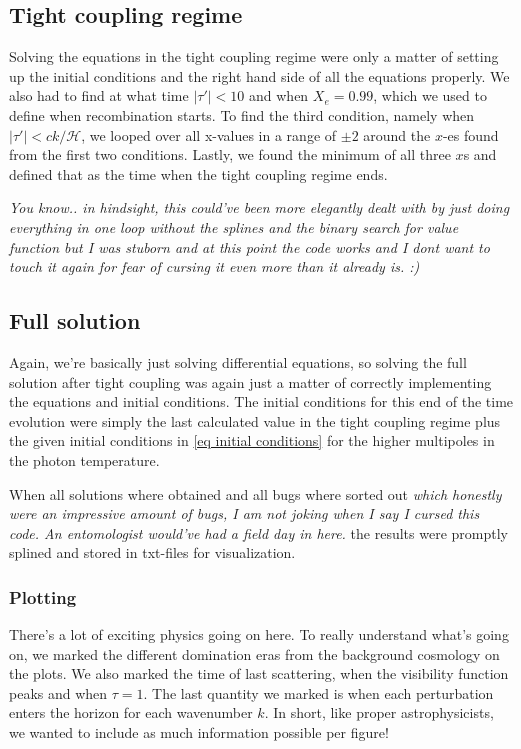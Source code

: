 \documentclass[12pt]{article}
\begin{document}
\subsection{Tight coupling regime}
Solving the equations in the tight coupling regime were only a matter of setting up the initial conditions and the right hand side of all the equations properly. We also had to find at what time  $|\tau'|<10$ and when $X_e=0.99$, which we used to define when recombination starts. To find the third condition, namely when $|\tau'|<ck/\mathcal{H}$, we looped over all x-values in a range of $\pm 2$ around the $x$-es found from the first two conditions. Lastly, we found the minimum of all three $x$s and defined that as the time when the tight coupling regime ends. 

\textit{You know.. in hindsight, this could've been more elegantly dealt with by just doing everything in one loop without the splines and the binary search for value function but I was stuborn and at this point the code works and I dont want to touch it again for fear of cursing it even more than it already is. :)}

\subsection{Full solution}
Again, we're basically just solving differential equations, so solving the full solution after tight coupling was again just a matter of correctly implementing the equations and initial conditions. The initial conditions for this end of the time evolution were simply the last calculated value in the tight coupling regime plus the given initial conditions in \cref{eq initial conditions} for the higher multipoles in the photon temperature. 

When all solutions where obtained and all bugs where sorted out \textit{which honestly were an impressive amount of bugs, I am not joking when I say I cursed this code. An entomologist would've had a field day in here.} the results were promptly splined and stored in txt-files for visualization.

\subsubsection{Plotting}
There's a lot of exciting physics going on here. To really understand what's going on, we marked the different domination eras from the background cosmology on the plots. We also marked the time of last scattering, when the visibility function peaks and when $\tau=1$. The last quantity we marked is when each perturbation enters the horizon for each wavenumber $k$. In short, like proper astrophysicists, we wanted to include as much information possible per figure! 
\end{document}
